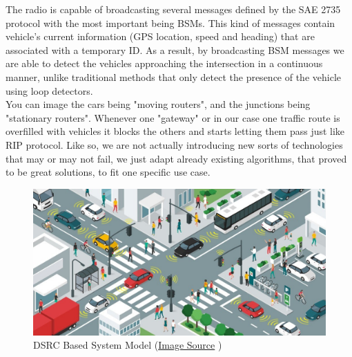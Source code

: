 \documentclass[17pt]{report}
\begin{document}
\indent \indent 
The radio is capable of broadcasting several messages defined by the SAE 2735
\cite{Kenney2011IOT} protocol with the most important being BSMs. This kind of 
messages contain vehicle's current information (GPS location, speed and heading) that are associated with a temporary ID. As a result, by broadcasting
BSM messages we are able to detect the vehicles approaching the intersection in a
continuous manner, unlike traditional methods that only detect the presence of the
vehicle using loop detectors.\\
\indent \indent 
You can image the cars being "moving routers", and the junctions being
"stationary routers". Whenever one "gateway" or in our case one traffic route is
overfilled with vehicles it blocks the others and starts letting them pass just like
RIP protocol. Like so, we are not actually introducing new sorts of technologies  that may
or may not fail, we just adapt already existing algorithms, that proved to be great
solutions, to fit one specific use case.

\begin{figure}[h!]
    \includegraphics[width=\textwidth]{DSRCSystemModel.jpg}
    \caption{DSRC Based System Model 
    (\href{https://www.frost.com/frost-perspectives/what-is-required-for-a-scalable-and-industry-wide-vehicle-to-everything-v2x-deployment/}{Image Source} \textcopyright)}
    \label{fig:DSRCSystemModel}
\end{figure}
\end{document}
